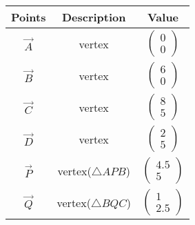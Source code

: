 \begin{tabular}{|c|c|c|}
\hline
    \textbf{Points} &\textbf{Description}&\textbf{Value} \\
    \hline
     $\vec{A}$& vertex &$\begin{pmatrix}
     0\\0
     \end{pmatrix}$\\
     \hline
     $\vec{B}$& vertex &$\begin{pmatrix}
     6\\0
     \end{pmatrix}$\\
     \hline
     $\vec{C}$& vertex &$\begin{pmatrix}
     8\\5
     \end{pmatrix}$\\
     \hline
     $\vec{D}$& vertex &$\begin{pmatrix}
     2\\5
     \end{pmatrix}$\\
     \hline
     $\vec{ P}$& vertex($\triangle APB$) &$\begin{pmatrix}
     4.5\\5
     \end{pmatrix}$\\
     \hline
      $\vec{Q}$& vertex($\triangle BQC$) &$\begin{pmatrix}
     1\\2.5
     \end{pmatrix}$\\
     \hline
     
     
\end{tabular}


